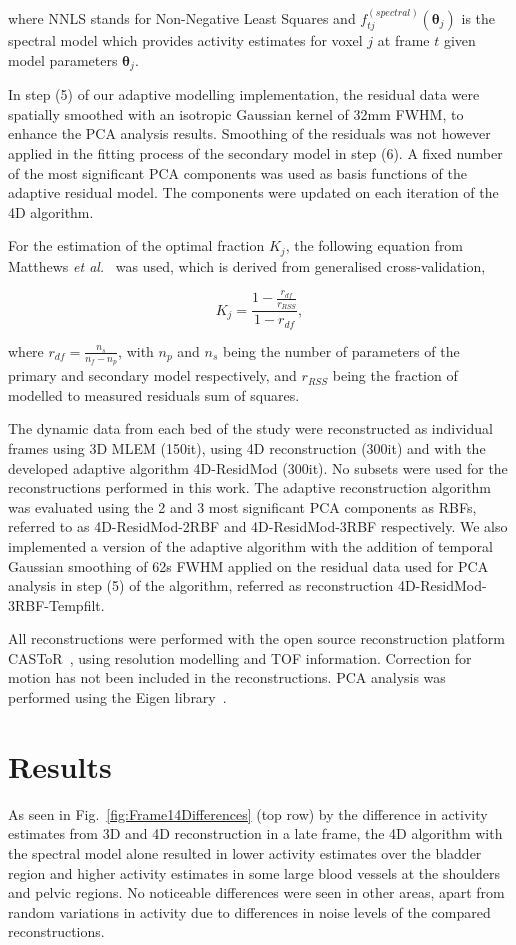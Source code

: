 where NNLS stands for Non-Negative Least Squares and $f_{tj}^{(spectral)}(\bm{\theta}_{j})$ is the spectral model which provides activity estimates for voxel $j$ at frame $t$ given model parameters $\bm{\theta}_{j}$.
        
In step (5) of our adaptive modelling implementation, the residual data were spatially smoothed with an isotropic Gaussian kernel of 32mm FWHM, to enhance the PCA analysis results. Smoothing of the residuals was not however applied in the fitting process of the secondary model in step (6). A fixed number of the most significant PCA components was used as basis functions of the adaptive residual model. The components were updated on each iteration of the 4D algorithm.

For the estimation of the optimal fraction $K_{j}$, the following equation from Matthews \textit{et al.}~\cite{Matthews2012} was used, which is derived from generalised cross-validation,

\begin{equation}
K_{j} = \frac{1-\frac{r_{df}}{r_{RSS}}}{1-r_{df}} , 
\end{equation}

where $r_{df} = \frac{n_s}{n_f - n_p}$, with $n_p$ and $n_s$ being the number of parameters of the primary and secondary model respectively, and $r_{RSS}$ being the fraction of modelled to measured residuals sum of squares. 

The dynamic data from each bed of the study were reconstructed as individual frames using 3D MLEM (150it), using 4D reconstruction (300it) and with the developed adaptive algorithm 4D-ResidMod (300it).
No subsets were used for the reconstructions performed in this work.
The adaptive reconstruction algorithm was evaluated using the 2 and 3 most significant PCA components as RBFs, referred to as 4D-ResidMod-2RBF and 4D-ResidMod-3RBF respectively. We also implemented a version of the adaptive algorithm with the addition of temporal Gaussian smoothing of 62s FWHM applied on the residual data used for PCA analysis in step (5) of the algorithm, referred as reconstruction 4D-ResidMod-3RBF-Tempfilt.

All reconstructions were performed with the open source reconstruction platform CASToR~\cite{Merlin2018}, using resolution modelling and TOF information. Correction for motion has not been included in the reconstructions. PCA analysis was performed using the Eigen library~\cite{eigenweb}. 

\section{Results}
As seen in Fig.~\ref{fig:Frame14Differences} (top row) by the difference in activity estimates from 3D and 4D reconstruction in a late frame, the 4D algorithm with the spectral model alone resulted in lower activity estimates over the bladder region and higher activity estimates in some large blood vessels at the shoulders and pelvic regions. No noticeable differences were seen in other areas, apart from random variations in activity due to differences in noise levels of the compared reconstructions.

